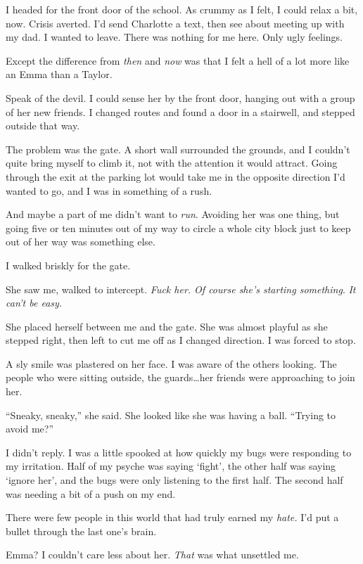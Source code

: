 I headed for the front door of the school.  As crummy as I felt, I could relax a bit, now.  Crisis averted.  I'd send Charlotte a text, then see about meeting up with my dad.  I wanted to leave.  There was nothing for me here.  Only ugly feelings.



Except the difference from \emph{then} and \emph{now} was that I felt a hell of a lot more like an Emma than a Taylor.



Speak of the devil.  I could sense her by the front door, hanging out with a group of her new friends.  I changed routes and found a door in a stairwell, and stepped outside that way.



The problem was the gate.  A short wall surrounded the grounds, and I couldn't quite bring myself to climb it, not with the attention it would attract.  Going through the exit at the parking lot would take me in the opposite direction I'd wanted to go, and I was in something of a rush.



And maybe a part of me didn't want to \emph{run}.  Avoiding her was one thing, but going five or ten minutes out of my way to circle a whole city block just to keep out of her way was something else.



I walked briskly for the gate.



She saw me, walked to intercept.  \emph{Fuck her.  Of course she's starting something}.  \emph{It can't be easy.}



She placed herself between me and the gate.  She was almost playful as she stepped right, then left to cut me off as I changed direction.  I was forced to stop.



A sly smile was plastered on her face.  I was aware of the others looking.  The people who were sitting outside, the guards\ldots her friends were approaching to join her.



``Sneaky, sneaky,'' she said.  She looked like she was having a ball.  ``Trying to avoid me?''



I didn't reply.  I was a little spooked at how quickly my bugs were responding to my irritation.  Half of my psyche was saying `fight', the other half was saying `ignore her', and the bugs were only listening to the first half.  The second half was needing a bit of a push on my end.



There were few people in this world that had truly earned my \emph{hate.  }I'd put a bullet through the last one's brain.



Emma?  I couldn't care less about her.  \emph{That} was what unsettled me.





